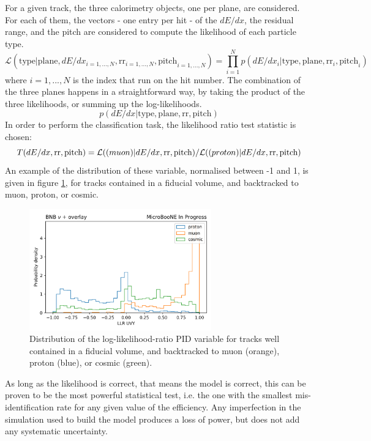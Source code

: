 \documentclass[a4paper]{article}
\begin{document}
For a given track, the three calorimetry objects, one per plane, are considered.
For each of them, the vectors - one entry per hit - of the $dE/dx$, the residual range, and the pitch are considered to compute the likelihood of each particle type.
\[ \mathcal{L}(\text{type} | \text{plane}, dE/dx_{i = 1, ..., N},   \text{rr}_{i = 1, ..., N}, \text{pitch}_{i = 1, ..., N}) = \prod_{i=1}^N p(dE/dx_i | \text{type}, \text{plane}, \text{rr}_i, \text{pitch}_i) \]
where $i=1, ..., N$ is the index that run on the hit number.
The combination of the three planes happens in a straightforward way, by taking the product of the three likelihoods, or summing up the log-likelihoods.
\[ p(dE/dx | \text{type}, \text{plane}, \text{rr}, \text{pitch}) \]
In order to perform the classification task, the likelihood ratio test statistic is chosen:
\[ T(dE/dx, \text{rr}, \text{pitch}) = \mathcal{L}(\text(muon)| dE/dx, \text{rr}, \text{pitch}) /  \mathcal{L}(\text(proton)| dE/dx, \text{rr}, \text{pitch}) \]
An example of the distribution of these variable, normalised between -1 and 1, is given in figure \ref{fig:llr_pid_uvy_example}, for tracks contained in a fiducial volume, and backtracked to muon, proton, or cosmic.

\begin{figure}[ht] 
    \centering
    \includegraphics[width=0.7\textwidth]{llrpid/llr_012_n.png}
    \caption{Distribution of the log-likelihood-ratio PID variable for tracks well contained in a fiducial volume, and backtracked to muon (orange), proton (blue), or cosmic (green).}
    \label{fig:llr_pid_uvy_example}
\end{figure}

As long as the likelihood is correct, that means the model is correct, this can be proven to be the most powerful statistical test, i.e. the one with the smallest mis-identification rate for any given value of the efficiency.
Any imperfection in the simulation used to build the model produces a loss of power, but does not add any systematic uncertainty.
\end{document}

